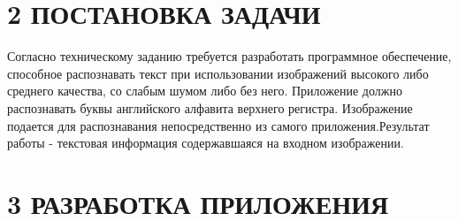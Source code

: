 \documentclass[14pt,a4paper]{extreport}
\begin{document}
         
	\newpage
	\section*{\normalsize\hspace{2ex}2 ПОСТАНОВКА ЗАДАЧИ}

\hspace{4ex} Согласно техническому заданию требуется разработать программное обеспечение, способное распознавать текст при использовании изображений высокого либо среднего качества, со слабым шумом либо без него. Приложение должно распознавать буквы английского алфавита верхнего регистра. Изображение подается для распознавания непосредственно из самого приложения.Результат работы - текстовая информация содержавшаяся на входном изображении.




	\newpage
	\section*{\normalsize\hspace{3ex} 3 РАЗРАБОТКА ПРИЛОЖЕНИЯ}
\end{document}
